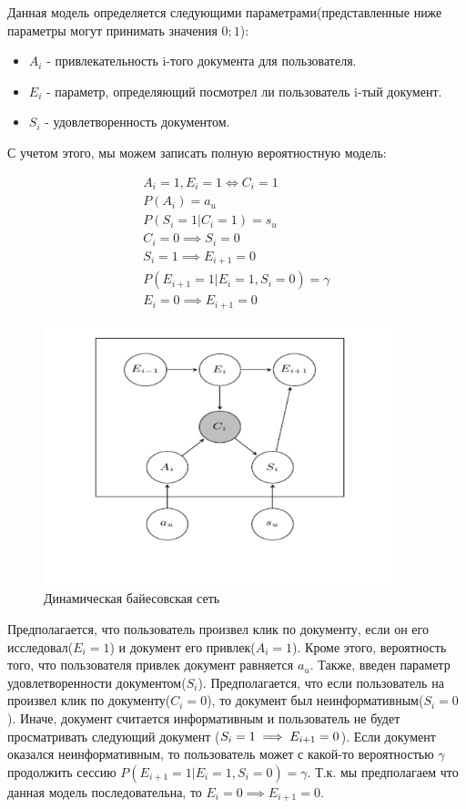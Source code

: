 Данная модель определяется следующими параметрами(представленные ниже параметры могут принимать значения ${0;1}$): 
\begin{itemize}
	\item $A_i$ - привлекательность i-того документа для пользователя. 
	\item $E_i$ - параметр, определяющий посмотрел ли пользователь i-тый документ. 
	\item $S_i$ - удовлетворенность документом.
\end{itemize}

С учетом этого, мы можем записать полную вероятностную модель:

\begin{subequations}
\begin{align}
	A_i=1,E_i=1 \iff  C_i=1 \\
	P(A_i)=a_u \\
	P(S_i=1|C_i=1)=s_u \\
	C_i=0 \implies S_i=0 \\
	S_i=1 \implies E_{i+1}=0 \\
	P(E_{i+1}=1|E_i=1,S_i=0)=\gamma \\
	E_i=0 \implies E_{i+1}=0 
\end{align}
\end{subequations}

\begin{figure}
  \centering
  \includegraphics[width=0.9\textwidth]{images/dbn.png}
  \caption{Динамическая байесовская сеть\label{dbn-picture}}
\end{figure}

Предполагается, что пользователь произвел клик по документу, если он его исследовал($E_i=1$) и документ его привлек($A_i=1$). Кроме этого, вероятность того, что пользователя привлек документ равняется $a_u$. Также, введен параметр удовлетворенности документом($S_i$). Предполагается, что если пользователь на произвел клик по документу($C_i=0$), то документ был неинформативным($S_i=0$). Иначе, документ считается информативным и пользователь не будет просматривать следующий документ ($S_i=1 \implies E_{i+1}=0 \\$). Если документ оказался неинформативным, то пользователь может с какой-то вероятностью $\gamma$ продолжить сессию $P(E_{i+1}=1|E_i=1,S_i=0)=\gamma$. Т.к. мы предполагаем что данная модель последовательна, то $E_i=0 \implies E_{i+1}=0$.


